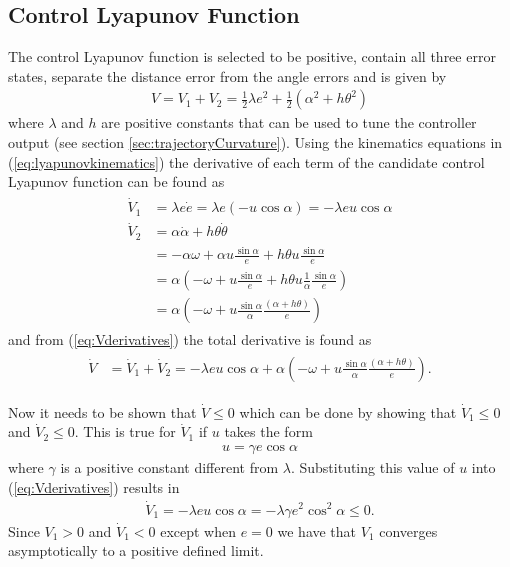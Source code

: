 \subsection{Control Lyapunov Function}
\label{sec:controllyapunov}
The control Lyapunov function is selected to be positive, contain all three error states, separate the distance error from the angle errors and is given by
\begin{align*}
V = V_1 + V_2 = \frac{1}{2}\lambda e^2 + \frac{1}{2}\left(\alpha^2+h\theta^2\right)
\end{align*}
where $\lambda$ and $h$ are positive constants that can be used to tune the controller output (see section \ref{sec:trajectoryCurvature}). Using the kinematics equations in (\ref{eq:lyapunovkinematics}) the derivative of each term of the candidate control Lyapunov function can be found as
\begin{align}
\label{eq:Vderivatives}
\begin{split}
\dot{V}_1 &= \lambda e\dot{e} = \lambda e (-u\cos\alpha) = -\lambda eu\cos\alpha \\
\dot{V}_2 &= \alpha\dot{\alpha}+h\theta\dot{\theta} \\
&= -\alpha\omega + \alpha u\frac{\sin\alpha}{e} + h\theta u\frac{\sin\alpha}{e} \\
&= \alpha\left(-\omega + u\frac{\sin\alpha}{e} + h\theta u\frac{1}{\alpha}\frac{\sin\alpha}{e}\right) \\
&= \alpha\left(-\omega + u\frac{\sin\alpha}{\alpha}\frac{(\alpha+h\theta)}{e}\right)
\end{split}
\end{align}
and from (\ref{eq:Vderivatives}) the total derivative is found as
\begin{align}
\label{eq:lyapunovfunctionderivative}
\begin{split}
\dot{V} &= \dot{V}_1 + \dot{V}_2 = -\lambda e u\cos\alpha + \alpha\left(-\omega+u\frac{\sin\alpha}{\alpha}\frac{(\alpha+h\theta)}{e}\right).
\end{split}
\end{align}

Now it needs to be shown that $\dot{V}\leq0$ which can be done by showing that $\dot{V}_1\leq0$ and $\dot{V}_2\leq0$. This is true for $\dot{V}_1$ if $u$ takes the form
\begin{align}
\label{eq:lyapunovu}
u = \gamma e\cos\alpha
\end{align}
where $\gamma$ is a positive constant different from $\lambda$. Substituting this value of $u$ into (\ref{eq:Vderivatives}) results in
\begin{align}
\label{eq:V1dotfinal}
\dot{V}_1 = -\lambda eu\cos\alpha = -\lambda\gamma e^2\cos^2\alpha \leq 0.
\end{align}
Since $V_1>0$ and $\dot{V}_1<0$ except when $e=0$ we have that $V_1$ converges asymptotically to a positive defined limit.

